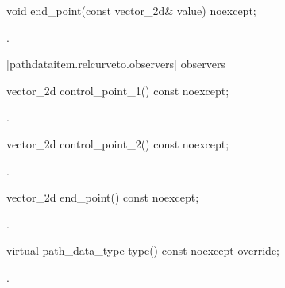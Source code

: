 \begin{itemdecl}
    void end_point(const vector_2d& value) noexcept;
\end{itemdecl}
\begin{itemdescr}
	\pnum
	\postconditions
	.
\end{itemdescr}

 [pathdataitem.relcurveto.observers]{ observers}

\begin{itemdecl}
    vector_2d control_point_1() const noexcept;
\end{itemdecl}
\begin{itemdescr}
	\pnum
	\returns
	.
\end{itemdescr}

\begin{itemdecl}
    vector_2d control_point_2() const noexcept;
\end{itemdecl}
\begin{itemdescr}
	\pnum
	\returns
	.
\end{itemdescr}

\begin{itemdecl}
    vector_2d end_point() const noexcept;
\end{itemdecl}
\begin{itemdescr}
	\pnum
	\returns
	.
\end{itemdescr}

\begin{itemdecl}
    virtual path_data_type type() const noexcept override;
\end{itemdecl}
\begin{itemdescr}
	\pnum
	\returns
	.
\end{itemdescr}
